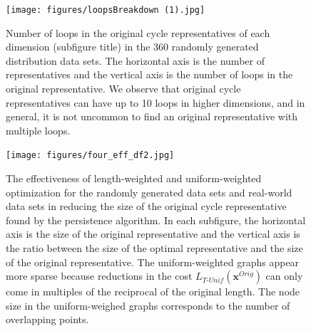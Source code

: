 \documentclass[utf8]{formatting_stuff/frontiersFPHY}
\newcommand{\originalrep}{\mathbf{x}^{Orig}}
\newcommand{\TU}{_{T\text{-}Unif}}
\theoremstyle{plain}
\theoremstyle{definition}
\begin{document}
 \newpage 
 \begin{figure}[h!]
\begin{center}
\texttt{[image: figures/loopsBreakdown (1).jpg]}
\end{center}
\caption{  
Number of loops in the original cycle representatives of each dimension (subfigure title) in the $360$ randomly generated distribution data sets. The horizontal axis is the number of representatives and the vertical axis is the number of loops in the original representative. We observe that original cycle representatives can have up to 10 loops in higher dimensions, and in general, it is not uncommon to find an original representative with multiple loops.} \label{fig:loopsbreakdown}
\end{figure} 

\newpage 
\begin{figure}[h!]
\begin{center}
\texttt{[image: figures/four\_eff\_df2.jpg]} 
\end{center}
\caption{The effectiveness of length-weighted and uniform-weighted optimization for the randomly generated data sets and real-world data sets in reducing the size of the original cycle representative found by the persistence algorithm. In each subfigure, the horizontal axis is the size of the original representative and the vertical axis is the ratio between the size of the optimal representative and the size of the original representative. The uniform-weighted graphs appear more sparse because reductions in the cost $L\TU(\originalrep)$ can only come in multiples of the reciprocal of the original length. The node size in the uniform-weighed graphs corresponds to the number of overlapping points.  
}\label{fig:effectivenessall}
\end{figure}
\end{document}
